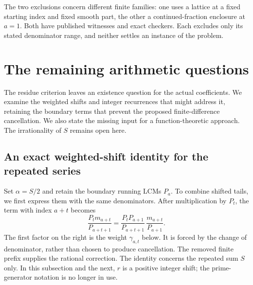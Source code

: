 \documentclass[11pt]{article}
\theoremstyle{remark}
\theoremstyle{plain}
\begin{document}
The two exclusions concern different finite families: one uses a
lattice at a fixed starting index and fixed smooth part, the other a continued-fraction
enclosure at $a=1$.  Both have published witnesses and exact checkers.
Each excludes only its stated denominator range, and neither settles an
instance of the problem.

\section{The remaining arithmetic questions}\label{long269:sec:open}

The residue criterion leaves an existence question for the actual
coefficients. We examine the weighted shifts and integer recurrences that
might address it, retaining the boundary terms that prevent the proposed
finite-difference cancellation. We also state the missing input for a
function-theoretic approach. The irrationality of $S$ remains open here.

\subsection{An exact weighted-shift identity for the repeated series}
\label{long269:sec:weighted-shifts}
Set $\alpha=S/2$ and retain the boundary running LCMs $P_a$. To combine
shifted tails, we first express them with the same denominators. After
multiplication by $P_t$, the term with index $a+t$ becomes
\[
 \frac{P_t m_{a+t}}{P_{a+t+1}}
 =\frac{P_tP_{a+1}}{P_{a+t+1}}\,
   \frac{m_{a+t}}{P_{a+1}}.
\]
The first factor on the right is the weight $\gamma_{a,t}$ below. It is
forced by the change of denominator, rather than chosen to produce
cancellation. The removed finite prefix supplies the rational correction.
The identity concerns the repeated sum $S$ only. In this subsection and
the next, $r$ is a positive integer shift; the prime-generator notation is
no longer in use.
\end{document}

